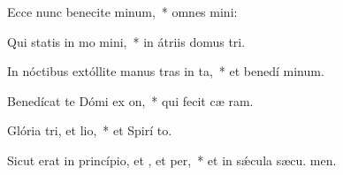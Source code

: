 \item Ecce nunc benecite minum,~* omnes  mini:
\item Qui statis in mo mini,~* in átriis domus  tri.
\item In nóctibus extóllite manus tras in ta,~* et benedí minum.
\item Benedícat te Dómi ex on,~* qui fecit cæ  ram.
\item Glória tri, et lio,~* et Spirí to.
\item Sicut erat in princípio, et , et per,~* et in sǽcula sæcu. men.
